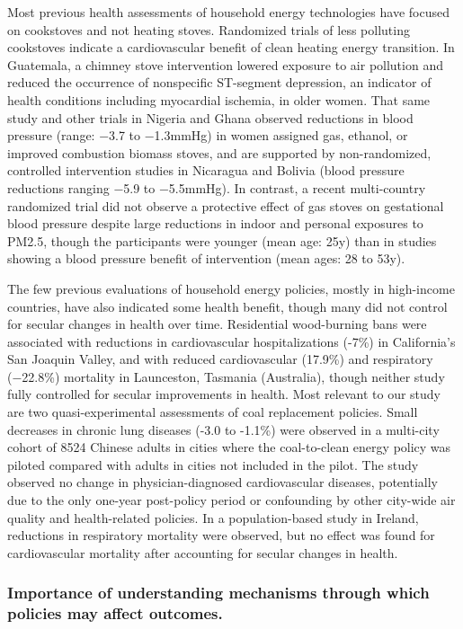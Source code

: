 \documentclass[
  letterpaper,
  DIV=11,
  numbers=noendperiod]{scrartcl}
\begin{document}
Most previous health assessments of household energy technologies have
focused on cookstoves and not heating stoves. Randomized trials of less
polluting cookstoves indicate a cardiovascular benefit of clean heating
energy transition. In Guatemala, a chimney stove intervention lowered
exposure to air pollution and reduced the occurrence of nonspecific
ST-segment depression, an indicator of health conditions including
myocardial ischemia, in older women. That same study and other trials in
Nigeria and Ghana observed reductions in blood pressure (range: −3.7 to
−1.3mmHg) in women assigned gas, ethanol, or improved combustion biomass
stoves, and are supported by non-randomized, controlled intervention
studies in Nicaragua and Bolivia (blood pressure reductions ranging −5.9
to −5.5mmHg). In contrast, a recent multi-country randomized trial did
not observe a protective effect of gas stoves on gestational blood
pressure despite large reductions in indoor and personal exposures to
PM2.5, though the participants were younger (mean age: 25y) than in
studies showing a blood pressure benefit of intervention (mean ages: 28
to 53y).

The few previous evaluations of household energy policies, mostly in
high-income countries, have also indicated some health benefit, though
many did not control for secular changes in health over time.
Residential wood-burning bans were associated with reductions in
cardiovascular hospitalizations (-7\%) in California's San Joaquin
Valley, and with reduced cardiovascular (17.9\%) and respiratory
(−22.8\%) mortality in Launceston, Tasmania (Australia), though neither
study fully controlled for secular improvements in health. Most relevant
to our study are two quasi-experimental assessments of coal replacement
policies. Small decreases in chronic lung diseases (-3.0 to -1.1\%) were
observed in a multi-city cohort of 8524 Chinese adults in cities where
the coal-to-clean energy policy was piloted compared with adults in
cities not included in the pilot. The study observed no change in
physician-diagnosed cardiovascular diseases, potentially due to the only
one-year post-policy period or confounding by other city-wide air
quality and health-related policies. In a population-based study in
Ireland, reductions in respiratory mortality were observed, but no
effect was found for cardiovascular mortality after accounting for
secular changes in health.

\subsubsection{Importance of understanding mechanisms through which
policies may affect
outcomes.}\label{importance-of-understanding-mechanisms-through-which-policies-may-affect-outcomes.}
\end{document}
